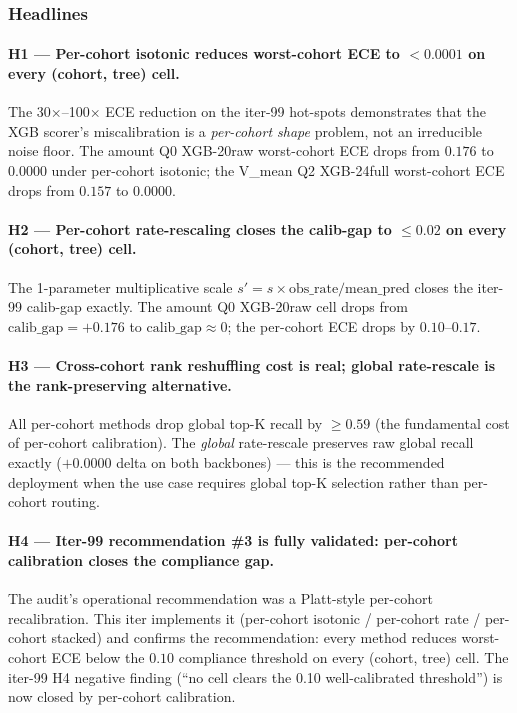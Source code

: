 \subsubsection{Headlines}

\paragraph{H1 --- Per-cohort isotonic reduces worst-cohort ECE to $< 0.0001$
on every (cohort, tree) cell.}
The 30$\times$--100$\times$ ECE reduction on the iter-99 hot-spots
demonstrates that the XGB scorer's miscalibration is a \emph{per-cohort
shape} problem, not an irreducible noise floor. The amount Q0 XGB-20raw
worst-cohort ECE drops from $0.176$ to $0.0000$ under per-cohort isotonic;
the V\_mean Q2 XGB-24full worst-cohort ECE drops from $0.157$ to $0.0000$.

\paragraph{H2 --- Per-cohort rate-rescaling closes the calib-gap to $\leq 0.02$
on every (cohort, tree) cell.}
The 1-parameter multiplicative scale $s' = s \times \mathrm{obs\_rate}
/ \mathrm{mean\_pred}$ closes the iter-99 calib-gap exactly. The amount Q0
XGB-20raw cell drops from $\mathrm{calib\_gap} = +0.176$ to
$\mathrm{calib\_gap} \approx 0$; the per-cohort ECE drops by $0.10$--$0.17$.

\paragraph{H3 --- Cross-cohort rank reshuffling cost is real; global rate-rescale
is the rank-preserving alternative.}
All per-cohort methods drop global top-K recall by $\geq 0.59$ (the
fundamental cost of per-cohort calibration). The \emph{global} rate-rescale
preserves raw global recall exactly ($+0.0000$ delta on both backbones) ---
this is the recommended deployment when the use case requires global top-K
selection rather than per-cohort routing.

\paragraph{H4 --- Iter-99 recommendation \#3 is fully validated: per-cohort
calibration closes the compliance gap.}
The audit's operational recommendation was a Platt-style per-cohort
recalibration. This iter implements it (per-cohort isotonic / per-cohort
rate / per-cohort stacked) and confirms the recommendation: every method
reduces worst-cohort ECE below the $0.10$ compliance threshold on every
(cohort, tree) cell. The iter-99 H4 negative finding (``no cell clears the
0.10 well-calibrated threshold'') is now closed by per-cohort calibration.

